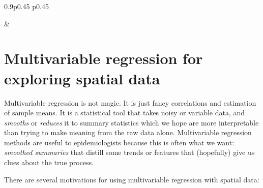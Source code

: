 \documentclass[
]{book}
\begin{document}
\begin{table}[ht]
\begin{centerbox}
\begin{threeparttable}
\begin{tabularx}{0.9\textwidth}{p{} p{}}

 &
 \tabularnewline[-0.5pt]


\end{tabularx}
\end{threeparttable}\par\end{centerbox}

\end{table}
 

\hypertarget{multivariable-regression-for-exploring-spatial-data}{%
\section{Multivariable regression for exploring spatial data}\label{multivariable-regression-for-exploring-spatial-data}}

Multivariable regression is not magic. It is just fancy correlations and estimation of sample means. It is a statistical tool that takes noisy or variable data, and \emph{smooths} or \emph{reduces} it to summary statistics which we hope are more interpretable than trying to make meaning from the raw data alone. Multivariable regression methods are useful to epidemiologists because this is often what we want: \emph{smoothed summaries} that distill some trends or features that (hopefully) give us clues about the true process.

There are several motivations for using multivariable regression with spatial data:
\end{document}
